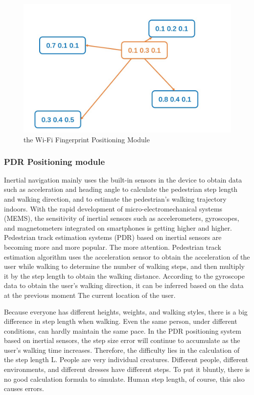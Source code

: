 \documentclass[conference]{IEEEtran}
\begin{document}
\begin{figure}[h]
	\centering
	\includegraphics[scale=0.4]{./figures/wifi.jpg}
	\caption{the Wi-Fi Fingerprint Positioning Module}
	\label{fig:wifi}
\end{figure}

\subsubsection{PDR Positioning module}

Inertial navigation mainly uses the built-in sensors in the device to obtain data such as acceleration and heading angle to calculate the pedestrian step length and walking direction, and to estimate the pedestrian's walking trajectory indoors. With the rapid development of micro-electromechanical systems (MEMS), the sensitivity of inertial sensors such as accelerometers, gyroscopes, and magnetometers integrated on smartphones is getting higher and higher. Pedestrian track estimation systems (PDR) based on inertial sensors are becoming more and more popular. The more attention. Pedestrian track estimation algorithm uses the acceleration sensor to obtain the acceleration of the user while walking to determine the number of walking steps, and then multiply it by the step length to obtain the walking distance. According to the gyroscope data to obtain the user’s walking direction, it can be inferred based on the data at the previous moment The current location of the user.

Because everyone has different heights, weights, and walking styles, there is a big difference in step length when walking. Even the same person, under different conditions, can hardly maintain the same pace. In the PDR positioning system based on inertial sensors, the step size error will continue to accumulate as the user's walking time increases. Therefore, the difficulty lies in the calculation of the step length L. People are very individual creatures. Different people, different environments, and different dresses have different steps. To put it bluntly, there is no good calculation formula to simulate. Human step length, of course, this also causes errors.
\end{document}
